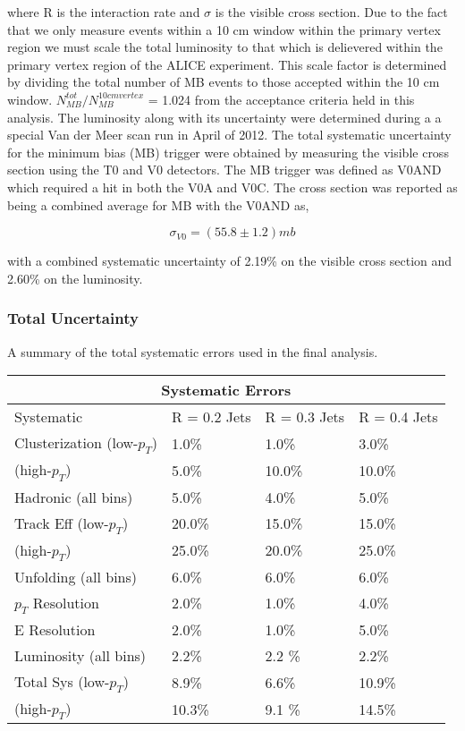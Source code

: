 \noindent
where R is the interaction rate and $\sigma$ is the visible cross section.  Due to the fact that we only measure events within a 10 cm window within the primary vertex region we must scale the total luminosity to that which is delievered within the primary vertex region of the ALICE experiment.  This scale factor is determined by dividing the total number of MB events to those accepted within the 10 cm window.  $N^{tot}_{MB} / N^{10 cm vertex}_{MB}$ = 1.024 from the acceptance criteria held in this analysis.
The luminosity along with its uncertainty were determined during a a special Van der Meer scan run in April of 2012\cite{ALICE-PUBLIC-2017-002}.  The total systematic uncertainty for the minimum bias (MB) trigger were obtained by measuring the visible cross section using the T0 and V0 detectors.  The MB trigger was defined as V0AND which required a hit in both the V0A and V0C.  The cross section was reported as being a combined average for MB with the V0AND as, 

\begin{equation}
\sigma_{V0} = (55.8 \pm 1.2) mb
\label{eq:xlumdef}
\end{equation}

\noindent
with a combined systematic uncertainty of 2.19\% on the visible cross section and 2.60\% on the luminosity. 


\subsubsection{Total Uncertainty}

A summary of the total systematic errors used in the final analysis.

\begin{tabular}{ |p{5cm}||p{3cm}|p{3cm}|p{3cm}|  }
 \hline
 \multicolumn{4}{|c|}{Systematic Errors} \\
 \hline
 Systematic &R = 0.2 Jets & R = 0.3 Jets& R = 0.4 Jets\\
 \hline
Clusterization (low-$p_{T}$) & 1.0\%    &1.0\%&  3.0\%\\
 (high-$p_{T}$)           &  5.0\%  & 10.0\%   &  10.0\%\\
Hadronic (all bins)&   5.0\% & 4.0\% & 5.0\%\\
Track Eff (low-$p_{T}$)&20.0\% & 15.0\% & 15.0\%\\
 (high-$p_{T}$)            &  25.0\%  & 20.0\%   &  25.0\%\\
Unfolding (all bins)& 6.0\% & 6.0\%&  6.0\%\\
$p_{T}$ Resolution & 2.0\% & 1.0\% & 4.0\%\\
E Resolution& 2.0\%   &1.0\% & 5.0\%\\
Luminosity (all bins) & 2.2\%  & 2.2 \% & 2.2\%\\
 \hline
 \hline
Total Sys (low-$p_{T}$) & 8.9\%  & 6.6\% & 10.9\%\\
(high-$p_{T}$) & 10.3\%  & 9.1 \% & 14.5\%\\
\hline
\end{tabular}


